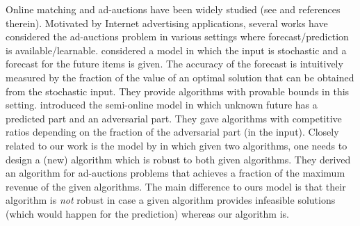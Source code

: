  Online matching and ad-auctions have been widely studied (see \cite{Mehta13:Online-Matching} and references therein). 
 Motivated by Internet advertising applications, 
 several works have considered the ad-auctions problem in various settings where forecast/prediction is available/learnable. 
 \citet{EsfandiariKorula18:Allocation-with} considered a model in which the input is stochastic and a forecast for the future items is given.       
The accuracy of the forecast is intuitively measured by the fraction of the value of an optimal solution that can be obtained from the stochastic input.
They provide algorithms with provable bounds in this setting. \citet{SchildVee19:Semi-Online-Bipartite} introduced 
the semi-online model in which unknown future has a predicted part and an 
adversarial part. They gave algorithms with competitive ratios depending on the fraction of the adversarial part (in the input). Closely related to our work is the model by \citet{MahdianNazerzadeh12:Online-Optimization}
in which given two algorithms, one needs to design a (new) algorithm which is robust to both given algorithms. They derived an algorithm for ad-auctions problems
that achieves a fraction of the maximum revenue of the given algorithms. The main difference to ours model is that their algorithm is \emph{not} robust in case a given algorithm provides infeasible solutions (which would happen for the prediction) whereas our algorithm is.  
 
 
  


